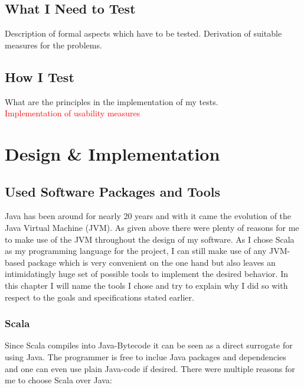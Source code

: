 \documentclass[11p]{scrartcl}
\begin{document}
\subsection{What I Need to Test}
Description of formal aspects which have to be tested. Derivation of suitable measures for the problems.
\subsection{How I Test}
What are the principles in the implementation of my tests.\\
\textcolor{red}{Implementation of usability measures}
 

\section{Design \& Implementation}
\label{sec:implementation}
\subsection{Used Software Packages and Tools}
Java has been around for nearly 20 years \cite{link:javaRelease1} and with it came the evolution of the Java Virtual Machine (JVM). As given above there were plenty of reasons for me to make use of the JVM throughout the design of my software.
As I chose Scala as my programming language for the project, I can still make use of any JVM-based package which is very convenient on the one hand but also leaves an intimidatingly huge set of possible tools to implement the desired behavior. In this chapter I will name the tools I chose and try to explain why I did so with respect to the goals and specifications stated earlier.

\subsubsection{Scala} %
Since Scala compiles into Java-Bytecode it can be seen as a direct surrogate for using Java. The programmer is free to inclue Java packages and dependencies and one can even use plain Java-code if desired. There were multiple reasons for me to choose Scala over Java:\\
\end{document}

